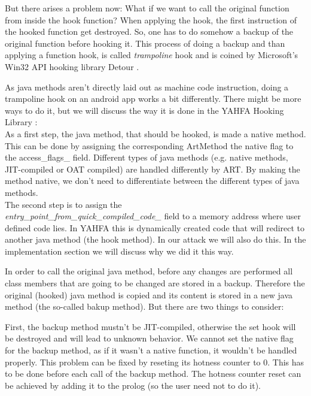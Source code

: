 But there arises a problem now: What if we want to call the original function from inside the hook function? When applying the hook, the first instruction of the hooked function get destroyed. So, one has to do somehow a backup of the original function before hooking it. This process of doing a backup and than applying a function hook, is called \emph{trampoline} hook and is coined by Microsoft's Win32 API hooking library Detour \cite{detours-binary-interception-of-win32-functions}.

As java methods aren't directly laid out as machine code instruction, doing a trampoline hook on an android app works a bit differently. There might be more ways to do it, but we will discuss the way it is done in the YAHFA Hooking Library \cite{YahfaGithub}:\\

As a first step, the java method, that should be hooked, is made a native method. This can be done by assigning the corresponding ArtMethod the native flag to the access\_flags\_ field. Different types of java methods (e.g. native methods, JIT-compiled or OAT compiled) are handled differently by ART. By making the method native, we don't need to differentiate between the different types of java methods.\\

The second step is to assign the \\\emph{entry\_point\_from\_quick\_compiled\_code\_} field to a memory address where user defined code lies. In YAHFA this is dynamically created code that will redirect to another java method (the hook method). In our attack we will also do this. In the implementation section we will discuss why we did it this way.

In order to call the original java method, before any changes are performed all class members that are going to be changed are stored in a backup. 
Therefore the original (hooked) java method is copied and its content is stored in a new java method (the so-called bakup method).
But there are two things to consider:

First, the backup method mustn't be JIT-compiled, otherwise the set hook will be destroyed and will lead to unknown behavior. 
We cannot set the native flag for the backup method, as if it wasn't a native function, it wouldn't be handled properly.
This problem can be fixed by reseting its hotness counter to 0. This has to be done before each call of the backup method. The hotness counter reset can be achieved by adding it to the prolog (so the user need not to do it).

